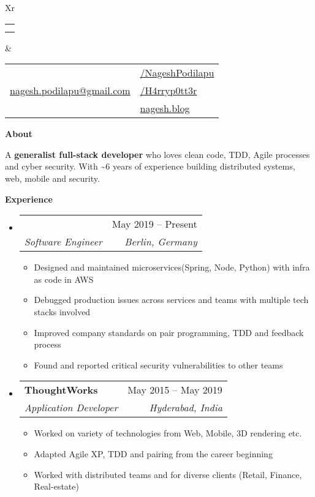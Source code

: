 \documentclass[letterpaper,12pt]{article}[leftmargin=*]
\makeatletter
\def \fullname {Nagesh Podilapu}
\def \subtitle {}
\def \linkedinicon {\faLinkedin}
\def \linkedinlink {https://www.linkedin.com/in/h4rryp0tt3r/}
\def \linkedintext {/NageshPodilapu}
\def \phoneicon {\faPhone}
\def \phonetext {+49 17627791530}
\def \emailicon {\faEnvelope}
\def \emaillink {mailto:nagesh.podilapu@gmail.com}
\def \emailtext {nagesh.podilapu@gmail.com}
\def \githubicon {\faGithub}
\def \githublink {https://github.com/H4rryp0tt3r}
\def \githubtext {/H4rryp0tt3r}
\def \websiteicon {\faGlobe}
\def \websitelink {https://nagesh.blog}
\def \websitetext {nagesh.blog}
\def \headertype {\doublecol} %
\def \entryspacing {-0pt}
\def \linkedin {\linkedinicon \hspace{3pt}\href{\linkedinlink}{\linkedintext}}
\def \phone {\phoneicon \hspace{3pt}{ \phonetext}}
\def \email {\emailicon \hspace{3pt}\href{\emaillink}{\emailtext}}
\def \github {\githubicon \hspace{3pt}\href{\githublink}{\githubtext}}
\def \website {\websiteicon \hspace{3pt}\href{\websitelink}{\websitetext}}
\renewcommand{\section}[2]{\vspace{5pt}
  \colorbox{secondary}{\color{white}\raggedbottom\normalsize\textbf{{#1}{\hspace{7pt}#2}}}
}
\newcommand{\resumeEntryStart}{\begin{itemize}[leftmargin=2.5mm]}
\newcommand{\resumeEntryEnd}{\end{itemize}\vspace{\entryspacing}}
\newcommand{\resumeEntryBioStart}{\vspace{8pt}\begin{adjustwidth}{2.5mm}{2.5mm}\small}
\newcommand{\resumeEntryBioEnd}{\end{adjustwidth}\vspace{6pt}}
\newcommand{\resumeItemListStart}{\begin{itemize}[leftmargin=4.5mm]}
\newcommand{\resumeItemListEnd}{\end{itemize}}
\newcommand{\resumeItem}[1]{
  \item\small{
    {#1 \vspace{-2pt}}
  }
}
\newcommand{\resumeEntryTSDL}[4]{
  \vspace{-1pt}\item[]
    \begin{tabularx}{0.97\textwidth}{X@{\hspace{60pt}}r}
      \textbf{\color{primary}#1} & {\firabook\color{accent}\small#2} \\
      \textit{\color{accent}\small#3} & \textit{\color{accent}\small#4} \\
    \end{tabularx}\vspace{-6pt}
}
\newcommand{\doublecol}[6]{
  \begin{tabularx}{\textwidth}{Xr}
    {
      \begin{tabular}[c]{l}
        \fontsize{35}{45}\selectfont{\color{primary}{{\textbf{\fullname}}}} \\
        {\textit{\subtitle}} %
      \end{tabular}
    } & {
      \begin{tabular}[c]{l@{\hspace{1.5em}}l}
        {\small#4} & {\small#1} \\
        {\small#5} & {\small#2} \\
        {\small#6} & {\small#3}
      \end{tabular}
    }
  \end{tabularx}
}
\newcommand{\singlecol}[6]{
  \begin{tabularx}{\textwidth}{Xr}
    {
      \begin{tabular}[b]{l}
        \fontsize{35}{45}\selectfont{\color{primary}{{\textbf{\fullname}}}} \\
        {\textit{\subtitle}} %
      \end{tabular}
    } & {
      \begin{tabular}[c]{l}
        {\small#1} \\
        {\small#2} \\
        {\small#3} \\
        {\small#4} \\
        {\small#5} \\
        {\small#6}
      \end{tabular}
    }
  \end{tabularx}
}
\makeatother
\begin{document}


\headertype{\linkedin}{\github}{\website}{\phone}{\email}{} %

\section{\faUser}{About}
  \resumeEntryBioStart
  {A \textbf{generalist full-stack developer} who loves clean code, TDD, Agile processes and cyber security. With \textasciitilde 6 years of experience building distributed systems, web, mobile and security.}
  \resumeEntryBioEnd
\section{\faPieChart}{Experience}

  \resumeEntryStart
    \resumeEntryTSDL
      {{\color{immoscoutcolor}Immo}{\color{scoutcolor}Scout24}}{May 2019 -- Present}
      {Software Engineer}{Berlin, Germany}
    \resumeItemListStart
      \resumeItem {Designed and maintained microservices(Spring, Node, Python) with infra as code in AWS}
      \resumeItem {Debugged production issues across services and teams with multiple tech stacks involved}
      \resumeItem {Improved company standards on pair programming, TDD and feedback process}
      \resumeItem {Found and reported critical security vulnerabilities to other teams}
    \resumeItemListEnd
  \resumeEntryEnd

  \resumeEntryStart
    \resumeEntryTSDL
      {Thought{\normalfont Works\textsuperscript{\textregistered}}}{May 2015 -- May 2019}
      {Application Developer}{Hyderabad, India}
    \resumeItemListStart
      \resumeItem {Worked on variety of technologies from Web, Mobile, 3D rendering etc.}
      \resumeItem {Adapted Agile XP, TDD and pairing from the career beginning}
      \resumeItem {Worked with distributed teams and for diverse clients (Retail, Finance, Real-estate)}
    \resumeItemListEnd
  \resumeEntryEnd

\end{document}
